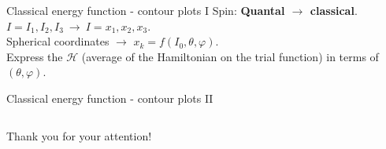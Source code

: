 \documentclass{beamer}
\begin{document}
\begin{frame}{Classical energy function - contour plots I}
Spin: \textbf{Quantal $\to$ classical}. $I=I_1,I_2,I_3\ \to\ I=x_1,x_2,x_3$. \\
Spherical coordinates $\to$ $x_k=f(I_0,\theta,\varphi)$.\\
Express the $\mathcal{H}$ (average of the Hamiltonian on the trial function) in terms of $(\theta,\varphi)$.
    \begin{columns} 
\begin{figure}
    \centering
    \includegraphics}
    \caption{Caption}
    \label{fig:my_label}
\end{figure}
\column{.5\textwidth}

\end{columns}
\end{frame}

\begin{frame}{Classical energy function - contour plots II}
    \begin{columns} 


\end{columns}
\end{frame}


\begin{frame}
\Huge{\centerline{Thank you for your attention!}}
\end{frame}
\end{document}
